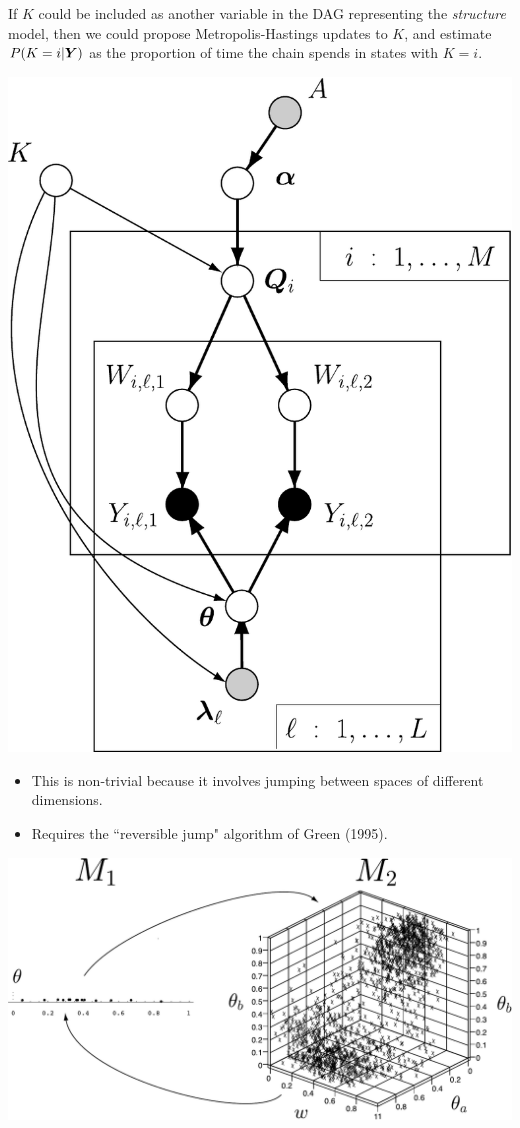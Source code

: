 \begin{minipage}{.35\textwidth}
If $K$ could be included as another variable in the DAG representing the {\em structure} model, then we could propose Metropolis-Hastings updates to $K$, and estimate $P(K=i|\bY)$ as the proportion of time the chain spends in states with $K=i$. 

\vspace*{.7in}
\end{minipage}
\hfill
\begin{minipage}{.62\textwidth}
\begin{center}
\includegraphics[width=.61\textwidth]{illus/PritchSimpleWithK.pdf}
\end{center}
\end{minipage}



\begin{itemize}
\item This is non-trivial because it involves jumping between spaces of different dimensions.
\item Requires the ``reversible jump" algorithm of Green (1995).
\end{itemize}
\begin{center}
\includegraphics[width=.8\textwidth]{illus/jumpbetween.pdf}
\end{center}

